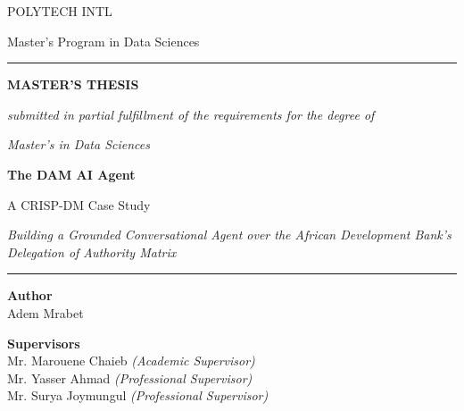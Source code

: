 \begin{titlepage}
\centering

{\sffamily\small\color{thesisgray} POLYTECH INTL \par}
\vspace{2pt}
{\sffamily\small\color{thesisgray} Master's Program in Data Sciences \par}

\vspace{1.2cm}
{\color{thesisgreen}\rule{0.55\textwidth}{1.2pt}} \par
\vspace{1.4cm}

{\sffamily\bfseries\Large\color{thesisgray} MASTER'S THESIS \par}
\vspace{0.3cm}
{\sffamily\small\itshape\color{thesisgray} submitted in partial fulfillment of the requirements for the degree of \par}
{\sffamily\small\itshape\color{thesisgray} Master's in Data Sciences \par}

\vspace{1.6cm}
{\sffamily\bfseries\huge\color{thesisgreendark} The DAM AI Agent \par}
\vspace{0.4cm}
{\sffamily\Large\color{thesisgreen} A CRISP-DM Case Study \par}
\vspace{0.3cm}
{\sffamily\normalsize\itshape\color{thesisgray} Building a Grounded Conversational Agent over the African Development Bank's \\ Delegation of Authority Matrix \par}

\vspace{1.6cm}
{\color{thesisgreen}\rule{0.55\textwidth}{1.2pt}} \par
\vspace{1.4cm}

\begin{minipage}[t]{0.46\textwidth}
  \sffamily\small
  \raggedright
  \textbf{\color{thesisgreendark} Author}\\
  Adem Mrabet
\end{minipage}
\hfill
\begin{minipage}[t]{0.46\textwidth}
  \sffamily\small
  \raggedleft
  \textbf{\color{thesisgreendark} Supervisors}\\
  Mr. Marouene Chaieb \textit{(Academic Supervisor)}\\
  Mr. Yasser Ahmad \textit{(Professional Supervisor)}\\
  Mr. Surya Joymungul \textit{(Professional Supervisor)}
\end{minipage}


\end{titlepage}
